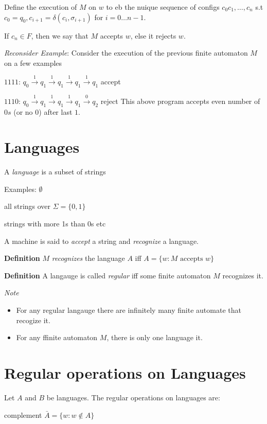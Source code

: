 \documentclass[oneside, 12pt]{book}
\begin{document}
Define the execution of $M$ on $w$ to eb the nuique sequence of configs $c_{0}c_{1},\dots,c_{n}$ s.t $c_{0}=q_{0}, c_{i+1}=\delta(c_{i}, \sigma_{i+1})$ for $i=0\dots n-1$.

If $c_{n}\in F$, then we say that $M$ accepts $w$, else it rejects $w$.

\emph{Reconsider Example}:
Consider the execution of the previous finite automaton $M$ on a few examples

$1111$: $q_{0}\stackrel{1}{\to}q_{1}\stackrel{1}{\to}q_{1}\stackrel{1}{\to}q_{1}\stackrel{1}{\to}q_{1}$ accept

$1110$:
$q_{0}\stackrel{1}{\to}q_{1}\stackrel{1}{\to}q_{1}\stackrel{1}{\to}q_{1}\stackrel{0}{\to}q_{2}$ reject
This above program accepts even number of $0s$ (or no $0$) after last $1$.

\section{Languages}

A \emph{language} is a subset of strings

Examples: $\emptyset$

all strings over $\Sigma = \{0,1\}$

strings with more 1s than 0s etc


A machine is said to \emph{accept} a string and \emph{recognize} a language.

\textbf{Definition} $M$ \emph{recognizes} the language $A$ iff $A=\{w:M\text{ accepts } w\}$


\textbf{Definition} A langauge is called \emph{regular} iff some finite automaton $M$ recognizes it.

\emph{Note}
\begin{itemize}
  \item For any regular langauge there are infinitely many finite automate that recogize it.
  \item For any ffinite automaton $M$, there is only one language it.
\end{itemize}



\section{Regular operations on Languages}
Let $A$ and $B$ be languages. The regular operations on languages are:

complement $\bar{A} = \{w:w\notin A\}$
\end{document}
